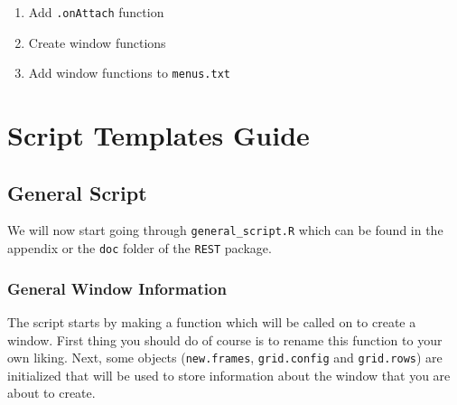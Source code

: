 \documentclass[a4paper]{article}\usepackage[]{graphicx}\usepackage[]{color}
\begin{document}
\begin{enumerate}
  \item Add \texttt{.onAttach} function
  \item Create window functions
  \item Add window functions to \texttt{menus.txt}
\end{enumerate}

\section{Script Templates Guide}

\subsection{General Script}
We will now start going through \texttt{general\_script.R} which can be found in
the appendix or the \verb|doc| folder of the \verb|REST| package.

\subsubsection{General Window Information}
\noindent The script starts by making a function which will be called on to
create a window. First thing you should do of course is to rename this function
to your own liking. Next, some objects (\verb|new.frames|, \verb|grid.config| and \verb|grid.rows|) are initialized that will be used to
store information about the window that you are about to create. 
\end{document}
